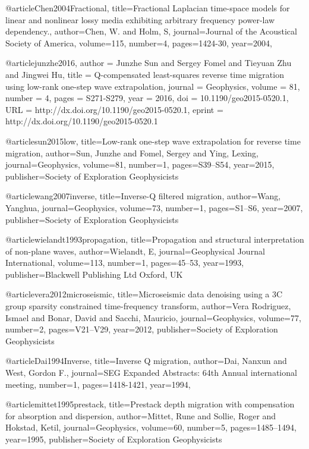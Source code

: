 {@article{Chen2004Fractional,
  title={Fractional Laplacian time-space models for linear and nonlinear lossy media exhibiting arbitrary frequency power-law dependency.},
  author={Chen, W. and Holm, S},
  journal={Journal of the Acoustical Society of America},
  volume={115},
  number={4},
  pages={1424-30},
  year={2004},
}

@article{junzhe2016,
author = {Junzhe Sun and Sergey Fomel and Tieyuan Zhu and Jingwei Hu},
title = {Q-compensated least-squares reverse time migration using low-rank one-step wave extrapolation},
journal = {Geophysics},
volume = {81},
number = {4},
pages = {S271-S279},
year = {2016},
doi = {10.1190/geo2015-0520.1},
URL = {http://dx.doi.org/10.1190/geo2015-0520.1},
eprint = {http://dx.doi.org/10.1190/geo2015-0520.1}
}

@article{sun2015low,
  title={Low-rank one-step wave extrapolation for reverse time migration},
  author={Sun, Junzhe and Fomel, Sergey and Ying, Lexing},
  journal={Geophysics},
  volume={81},
  number={1},
  pages={S39--S54},
  year={2015},
  publisher={Society of Exploration Geophysicists}
}

@article{wang2007inverse,
  title={Inverse-{Q} filtered migration},
  author={Wang, Yanghua},
  journal={Geophysics},
  volume={73},
  number={1},
  pages={S1--S6},
  year={2007},
  publisher={Society of Exploration Geophysicists}
}


@article{wielandt1993propagation,
  title={Propagation and structural interpretation of non-plane waves},
  author={Wielandt, E},
  journal={Geophysical Journal International},
  volume={113},
  number={1},
  pages={45--53},
  year={1993},
  publisher={Blackwell Publishing Ltd Oxford, UK}
}



@article{vera2012microseismic,
  title={Microseismic data denoising using a 3C group sparsity constrained time-frequency transform},
  author={Vera Rodriguez, Ismael and Bonar, David and Sacchi, Mauricio},
  journal={Geophysics},
  volume={77},
  number={2},
  pages={V21--V29},
  year={2012},
  publisher={Society of Exploration Geophysicists}
}



@article{Dai1994Inverse,
  title={Inverse {Q} migration},
  author={Dai, Nanxun and West, Gordon F.},
  journal={SEG Expanded Abstracts: 64th Annual international meeting},
  number={1},
  pages={1418-1421},
  year={1994},
}

@article{mittet1995prestack,
  title={Prestack depth migration with compensation for absorption and dispersion},
  author={Mittet, Rune and Sollie, Roger and Hokstad, Ketil},
  journal={Geophysics},
  volume={60},
  number={5},
  pages={1485--1494},
  year={1995},
  publisher={Society of Exploration Geophysicists}
}

}
